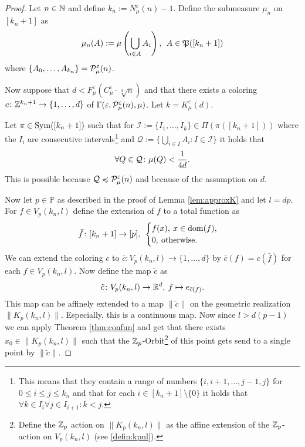 \begin{proof}
  Let $n \in \N$ and define $k_n := N_\mu^\varepsilon(n) - 1$. Define the submeasure $\mu_n$ on $[k_n+1]$ as \[\mu_n(A) := \mu\left(\bigcup\limits_{i\in A}A_i\right), \:\: A\in \PowS([k_n+1])\] where $\{A_0, \ldots, A_{k_n}\} = \P_\mu^\varepsilon(n)$.

  Now suppose that $d < F_\mu^\varepsilon(C_\mu^\varepsilon \cdot \sqrt[3]{n})$ and that there exists a coloring $c\colon \Z^{k_n+1}\to \{1,\ldots, d\}$ of $\Gamma(\varepsilon, \P_\mu^\varepsilon(n), \mu)$. Let $k = K_\mu^\varepsilon(d)$.

  Let $\pi \in {\rm Sym}([k_n+1])$ such that for $\mathcal{I} := \{I_1, \ldots, I_k\} \in \Pi(\pi([k_n+1]))$ where the $I_i$ are consecutive intervals\footnote{This means that they contain a range of numbers $\{i, i+1, \ldots, j-1, j\}$ for $0\leq i \leq j \leq k_n$ and that for each $i \in [k_n+1]\setminus\{0\}$ it holds that $\forall k \in I_i\forall j\in I_{i+1}\colon k < j$.} and $\mathcal{Q} := \{\bigcup\limits_{i \in I} A_i\colon I \in \mathcal{I}\}$ it holds that \[\forall Q \in \mathcal{Q}\colon \mu(Q) < {1 \over 4d}.\] This is possible because $\mathcal{Q} \preccurlyeq \P_\mu^\varepsilon(n)$ and because of the assumption on $d$.

  Now let $p\in \mathbb{P}$ as described in the proof of Lemma \ref{lem:approxK} and let $l = dp$. For $f \in V_p(k_n,l)$ define the extension of $f$ to a total function as
  \begin{equation*}
    \bar{f}\colon [k_n+1] \to [p], \:\: \begin{cases}
      f(x), \: x \in \dom(f), \\
      0, \: \text{otherwise}.
    \end{cases}
  \end{equation*}
  We can extend the coloring $c$ to $\bar{c}\colon V_p(k_n,l)\to \{1,\ldots,d\}$ by $\bar{c}(f) = c(\bar{f})$ for each $f \in V_p(k_n,l)$.
  Now define the map $\tilde{c}$ as
  \begin{equation*}
    \tilde{c}\colon V_p(k_n,l)\to \R^d, \: f \mapsto e_{\bar{c}(f)}.
  \end{equation*}
  This map can be affinely extended to a map $\lVert \tilde{c} \rVert$ on the geometric realization $\lVert K_p(k_n,l) \rVert$. Especially, this is a continuous map. Now since $l > d(p-1)$ we can apply Theorem \ref{thm:confun} and get that there exists $x_0 \in \lVert K_p(k_n, l) \rVert$ such that the $\Z_p$-Orbit\footnote{Define the $\Z_p$ action on $\lVert K_p(k_n, l)\rVert$ as the affine extension of the $\Z_p$-action on $V_p(k_n,l)$ (see \ref{defin:kpnl}).} of this point gets send to a single point by $\lVert \tilde{c} \rVert$. 


\end{proof}
